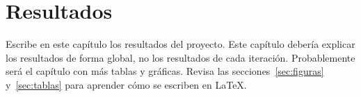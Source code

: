 \chapter{Resultados}
\label{ch:resultados}

Escribe en este capítulo los resultados del proyecto.  Este capítulo debería explicar los resultados de forma global, no los resultados de cada iteración.  Probablemente será el capítulo con más tablas y gráficas.  Revisa las secciones~\ref{sec:figuras} y~\ref{sec:tablas} para aprender cómo se escriben en \LaTeX{}.
